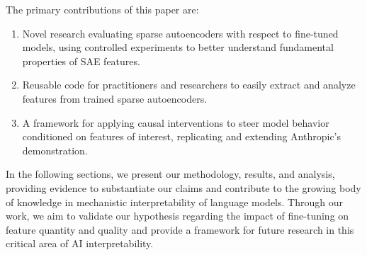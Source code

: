 The primary contributions of this paper are:

\begin{enumerate}
    \item Novel research evaluating sparse autoencoders with respect to fine-tuned models, using controlled experiments to better understand fundamental properties of SAE features.
    \item Reusable code for practitioners and researchers to easily extract and analyze features from trained sparse autoencoders.
    \item A framework for applying causal interventions to steer model behavior conditioned on features of interest, replicating and extending Anthropic's demonstration.
\end{enumerate}

In the following sections, we present our methodology, results, and analysis, providing evidence to substantiate our claims and contribute to the growing body of knowledge in mechanistic interpretability of language models. Through our work, we aim to validate our hypothesis regarding the impact of fine-tuning on feature quantity and quality and provide a framework for future research in this critical area of AI interpretability.